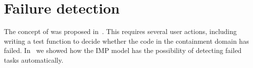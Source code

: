 \documentclass[11pt,fleqn,preprint]{taccreport}
\begin{document}
\section{Failure detection}

The concept of  was proposed in~\cite{Chung:2012:CDS}. This
requires several user actions, including writing a test function to
decide whether the code in the containment domain has
failed. In~\cite{IMP-04} we showed how the IMP model has the
possibility of detecting failed tasks automatically.




\end{document}

